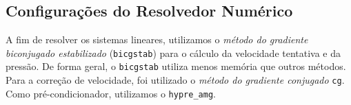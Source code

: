 \subsection{Configurações do Resolvedor Numérico}

A fim de resolver os sistemas lineares, utilizamos o \textit{método do gradiente biconjugado estabilizado} (\texttt{bicgstab}) para o cálculo da velocidade tentativa e da pressão. De forma geral, o \texttt{bicgstab} utiliza menos memória que outros métodos. Para a correção de velocidade, foi utilizado o \textit{método do gradiente conjugado} \texttt{cg}. Como pré-condicionador, utilizamos o \texttt{hypre\_amg}.

